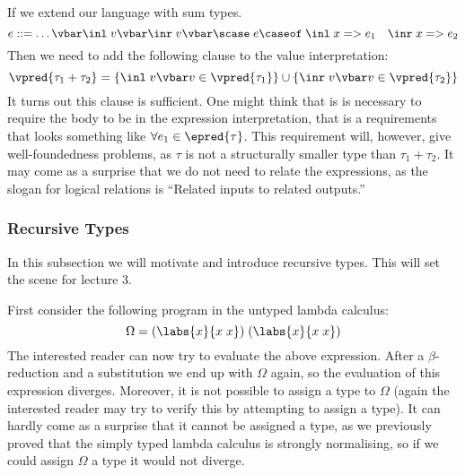 If we extend our language with sum types. %
\[
e::= \dots \vbar \inl \; v \vbar \inr \; v \vbar \scase \; e \caseof \; \inl \; x => e_1 \quad \inr \; x => e_2
\]
Then we need to add the following clause to the value interpretation:
\[
  \vpred{\tau_1 + \tau_2} = \{\inl \; v \vbar v \in \vpred{\tau_1}\} \cup
                           \{\inr \; v \vbar v \in \vpred{\tau_2}\}
\]
It turns out this clause is sufficient. One might think that is is necessary to require the body to be in the expression interpretation, that is a requirements that looks something like $\forall e_1 \in \epred{\tau}$. This requirement will, however, give well-foundedness problems, as $\tau$ is not a structurally smaller type than $\tau_1 + \tau_2$. It may come as a surprise that we do not need to relate the expressions, as the slogan for logical relations is ``Related inputs to related outputs.''

\subsubsection*{Recursive Types}
In this subsection we will motivate and introduce recursive types. This will set the scene for lecture 3.

First consider the  following program in the untyped lambda calculus:
\[
  \Omega = (\labs{x}{x \; x}) \; (\labs{x}{x \; x})
\]
The interested reader can now try to evaluate the above expression. After a $\beta$-reduction and a substitution we end up with $\Omega$ again, so the evaluation of this expression diverges. Moreover, it is not possible to assign a type to $\Omega$ (again the interested reader may try to verify this by attempting to assign a type). It can hardly come as a surprise that it cannot be assigned a type, as we previously proved that the simply typed lambda calculus is strongly normalising, so if we could assign $\Omega$ a type it would not diverge.

